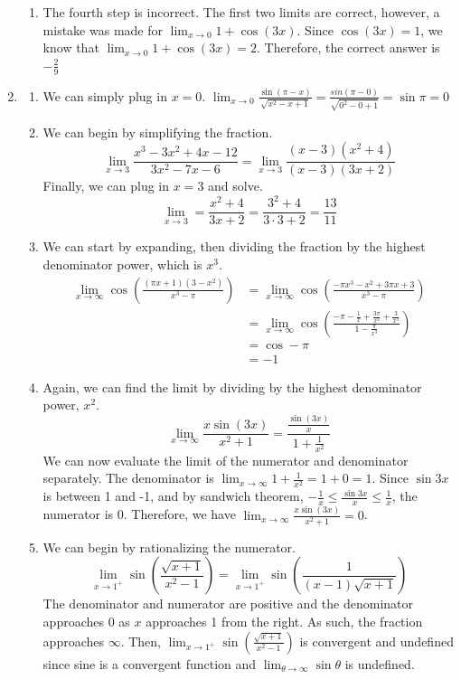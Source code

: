 \documentclass[11pt, letterpaper, twoside]{article}
\begin{document}
\begin{enumerate}
\begin{enumerate}[label=(\alph*)]
\item %
The fourth step is incorrect. The first two limits are correct, however, a mistake was made for $\lim_{x\to0} 1+\cos(3x)$. Since $\cos(3x)=1$, we know that $\lim_{x\to0} 1+\cos(3x)=2$. Therefore, the correct answer is $\boxed{-\frac{2}{9}}$ 
\end{enumerate}
\item\begin{enumerate}[label=(\alph*)] %
\item %
We can simply plug in $x=0$. $\lim_{x\to0}\frac{\sin(\pi-x)}{\sqrt{x^2-x+1}}=\frac{sin(\pi-0)}{\sqrt{0^2-0+1}}=\sin\pi=\boxed{0}$
\item %
We can begin by simplifying the fraction.
$$\lim_{x\to3}\frac{x^3-3x^2+4x-12}{3x^2-7x-6}=\lim_{x\to3}\frac{(x-3)(x^2+4)}{(x-3)(3x+2)}$$
Finally, we can plug in $x=3$ and solve.
$$\lim_{x\to3}=\frac{x^2+4}{3x+2}=\frac{3^2+4}{3\cdot3+2}=\boxed{\frac{13}{11}}$$
\item %
We can start by expanding, then dividing the fraction by the highest denominator power, which is $x^3$.
\begin{align*}
\lim_{x\to\infty}\cos\left(\frac{(\pi x+1)(3-x^2)}{x^3-\pi}\right)&=\lim_{x\to\infty}\cos\left(\frac{-\pi x^3-x^2+3\pi x+3}{x^3-\pi}\right)\\
&=\lim_{x\to\infty}\cos\left( \frac{-\pi-\frac{1}{x}+\frac{3\pi}{x^2}+\frac{3}{x^3}}{1-\frac{\pi}{x^3}}\right)\\
&= \cos -\pi \\
&= \boxed{-1}
\end{align*}
\item %
Again, we can find the limit by dividing by the highest denominator power, $x^2.$
$$\lim_{x\to \infty}\frac{x\sin(3x)}{x^2+1}=\frac{\frac{\sin(3x)}{x}}{1+\frac{1}{x^2}}$$
We can now evaluate the limit of the numerator and denominator separately. The denominator is $\lim_{x\to\infty}1+\frac{1}{x^2}=1+0=1$. Since $\sin 3x$ is between 1 and -1, and by sandwich theorem, $-\frac{1}{x}\leq \frac{\sin 3x}{x}\leq \frac{1}{x}$, the numerator is 0. Therefore, we have $\lim_{x\to \infty}\frac{x\sin(3x)}{x^2+1}=\boxed{0}$.
\item %
We can begin by rationalizing the numerator.
$$\lim_{x\to1^+}\sin\left(\frac{\sqrt{x+1}}{x^2-1}\right)=\lim_{x\to1^+}\sin\left(\frac{1}{(x-1)\sqrt{x+1}}\right)$$
The denominator and numerator are positive and the denominator approaches 0 as $x$ approaches 1 from the right. As such, the fraction approaches $\infty$. 
Then, $\lim_{x\to1^+} \sin\left(\frac{\sqrt{x+1}}{x^2-1}\right)$ is convergent and undefined since sine is a convergent function and $\lim_{\theta\to\infty}\sin\theta$ is undefined.

\end{enumerate}
\end{enumerate}
\end{document}
